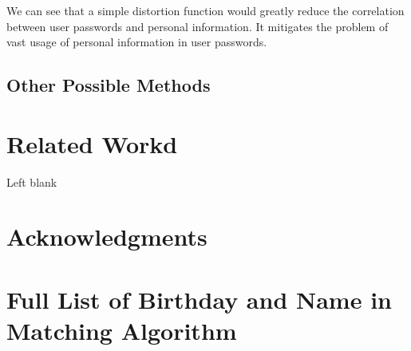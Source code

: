 \documentclass{sig-alternate}
\begin{document}
We can see that a simple distortion function would greatly reduce the correlation between user passwords and personal information. It mitigates the problem of vast usage of personal information in user passwords. 

\subsection{Other Possible Methods}



\section{Related Workd}
Left blank
\section{Acknowledgments}


%
%
\appendix
\section{Full List of Birthday and Name in Matching Algorithm}
\end{document}
